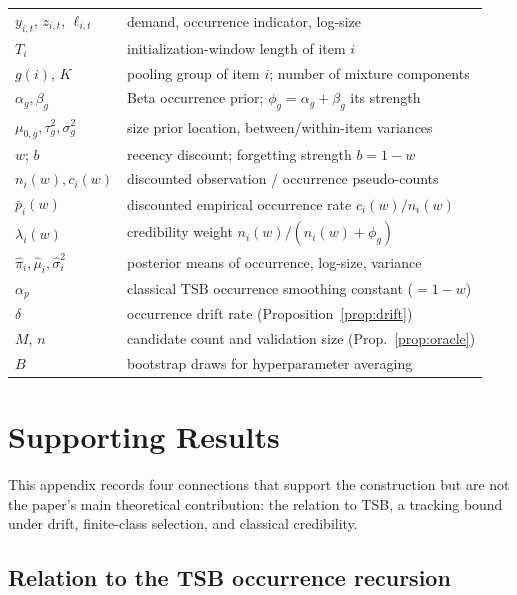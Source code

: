 \documentclass[twocolumn,10pt]{article}
\theoremstyle{definition}
\begin{document}
\begin{table}[h]
\centering
\small
\begin{tabular}{ll}
\toprule
$y_{i,t}$, $z_{i,t}$, $\ell_{i,t}$ & demand, occurrence indicator, log-size\\
$T_i$ & initialization-window length of item $i$\\
$g(i)$, $K$ & pooling group of item $i$; number of mixture components\\
$\alpha_g,\beta_g$ & Beta occurrence prior; $\phi_g=\alpha_g+\beta_g$ its strength\\
$\mu_{0,g},\tau^2_g,\sigma^2_g$ & size prior location, between/within-item variances\\
$w$; $b$ & recency discount; forgetting strength $b=1-w$\\
$n_i(w), c_i(w)$ & discounted observation / occurrence pseudo-counts\\
$\bar p_i(w)$ & discounted empirical occurrence rate $c_i(w)/n_i(w)$\\
$\lambda_i(w)$ & credibility weight $n_i(w)/(n_i(w)+\phi_g)$\\
$\hat\pi_i,\hat\mu_i,\hat\sigma^2_i$ & posterior means of occurrence, log-size, variance\\
$\alpha_p$ & classical TSB occurrence smoothing constant ($=1-w$)\\
$\delta$ & occurrence drift rate (Proposition~\ref{prop:drift})\\
$M$, $n$ & candidate count and validation size (Prop.~\ref{prop:oracle})\\
$B$ & bootstrap draws for hyperparameter averaging\\
\bottomrule
\end{tabular}
\end{table}

\section{Supporting Results}\label{app:supporting}

This appendix records four connections that support the construction but
are not the paper's main theoretical contribution: the relation to TSB,
a tracking bound under drift, finite-class selection, and classical
credibility.

\subsection{Relation to the TSB occurrence recursion}
\end{document}
